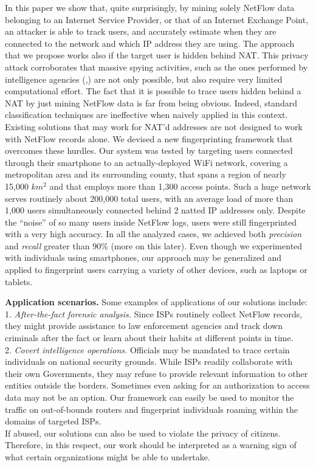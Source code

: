 \documentclass[10pt,conference,compsocconf,letterpaper]{IEEEtran}
\begin{document}
In this paper we show that, quite surprisingly, by mining solely NetFlow data belonging to an Internet Service Provider, or that of an Internet Exchange Point, an attacker is able to track users, and accurately estimate when they are connected to the network and which IP address they are using.  The approach that we propose works also if the target user is hidden behind NAT. This privacy attack corroborates that massive spying activities, such as the ones performed by intelligence agencies (\cite{Brandom2013},\cite{Ehrenfreund2013}) are not only possible, but also require very limited computational effort. 
The fact that it is possible to trace users hidden behind a NAT by just mining NetFlow data is far from being obvious. Indeed, standard classification techniques are ineffective when naively applied in this context. Existing solutions that may work for NAT'd addresses are not designed to work with NetFlow records alone. We devised a new fingerprinting framework that overcomes these hurdles. Our system was tested by targeting users connected through their smartphone to an actually-deployed WiFi network, covering a metropolitan area and its surrounding county, that spans a region of nearly 15,000 $km^2$ and that employs more than 1,300 access points. Such a huge network serves routinely about 200,000 total users, with an average load of more than 1,000 users simultaneously connected behind 2 natted IP addresses only. Despite the ``noise'' of so many users inside NetFlow logs,  users were still fingerprinted with a very high accuracy. In all the analyzed cases, we achieved both {\em precision} and {\em recall} greater than $90\%$ (more on this later). 
Even though we experimented with individuals using smartphones, our approach may be generalized and applied to 
fingerprint users carrying a variety of other devices, such as laptops or tablets.

{\bf Application scenarios.} Some examples of applications of our solutions include:\\
1. {\em After-the-fact forensic analysis.} Since ISPs routinely collect NetFlow records, they might provide assistance to law enforcement agencies and track down criminals after the fact or learn about their habits at different points in time. 
\\
2. {\em Covert intelligence operations.} Officials may be mandated to trace certain individuals on 
national security grounds. While ISPs readily collaborate with their own Governments, they may refuse to provide relevant information to other entities outside the borders. Sometimes even asking for an authorization to access data may not be an option. Our framework can easily be used to monitor the traffic on out-of-bounds routers and fingerprint individuals roaming within the domains of targeted ISPs. 
\\
If abused, our solutions can also be used to violate the privacy of citizens. Therefore, in this respect, our work should be interpreted as a warning sign of what certain organizations might be able to undertake.   
\end{document}
